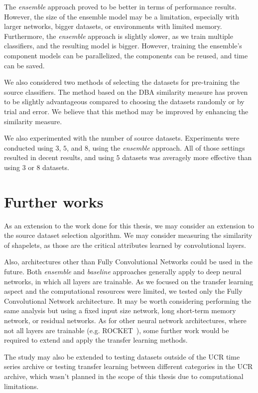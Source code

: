 \documentclass[a4paper,11pt,twoside]{report}
\theoremstyle{definition}
\begin{document}
The \textit{ensemble} approach proved to be better in terms of performance results. However, the size of the ensemble model may be a limitation, especially with larger networks, bigger datasets, or environments with limited memory. Furthermore, the \textit{ensemble} approach is slightly slower, as we train multiple classifiers, and the resulting model is bigger. However, training the ensemble's component models can be parallelized, the components can be reused, and time can be saved.


We also considered two methods of selecting the datasets for pre-training the source classifiers. The method based on the DBA similarity measure has proven to be slightly advantageous compared to choosing the datasets randomly or by trial and error. We believe that this method may be improved by enhancing the similarity measure.

We also experimented with the number of source datasets. Experiments were conducted using $3$, $5$, and $8$, using the \textit{ensemble} approach. All of those settings resulted in decent results, and using $5$ datasets was averagely more effective than using $3$ or $8$ datasets.

\section{Further works}
As an extension to the work done for this thesis, we may consider an extension to the source dataset selection algorithm. We may consider measuring the similarity of shapelets, as those are the critical attributes learned by convolutional layers.

Also, architectures other than Fully Convolutional Networks could be used in the future. Both \textit{ ensemble }and\textit{ baseline} approaches generally apply to deep neural networks, in which all layers are trainable. As we focused on the transfer learning aspect and the computational resources were limited, we tested only the Fully Convolutional Network architecture. It may be worth considering performing the same analysis but using a fixed input size network, long short-term memory network, or residual networks. As for other neural network architectures, where not all layers are trainable (e.g. ROCKET~\cite{rocket}), some further work would be required to extend and apply the transfer learning methods.

The study may also be extended to testing datasets outside of the UCR time series archive or testing transfer learning between different categories in the UCR archive, which wasn't planned in the scope of this thesis due to computational limitations.
\end{document}
